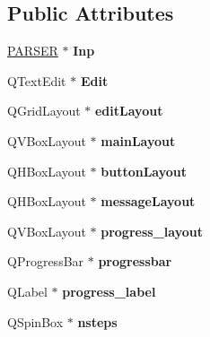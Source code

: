 \subsection*{Public Attributes}
\begin{DoxyCompactItemize}
\item 
\hypertarget{classMCWidget_af41f4fe9b11be0548003fb6eb9d2f733}{
\hyperlink{classPARSER}{PARSER} $\ast$ {\bfseries Inp}}
\label{classMCWidget_af41f4fe9b11be0548003fb6eb9d2f733}

\item 
\hypertarget{classMCWidget_a1a1b1f15ab4112cf8ffd85074c9d43ee}{
QTextEdit $\ast$ {\bfseries Edit}}
\label{classMCWidget_a1a1b1f15ab4112cf8ffd85074c9d43ee}

\item 
\hypertarget{classMCWidget_a6f1bc3f557bebcf39be998d2b3032920}{
QGridLayout $\ast$ {\bfseries editLayout}}
\label{classMCWidget_a6f1bc3f557bebcf39be998d2b3032920}

\item 
\hypertarget{classMCWidget_a7b5dc7811202dd6a863dbb42fd909889}{
QVBoxLayout $\ast$ {\bfseries mainLayout}}
\label{classMCWidget_a7b5dc7811202dd6a863dbb42fd909889}

\item 
\hypertarget{classMCWidget_ae07927c77de34c6c612f7a854482da89}{
QHBoxLayout $\ast$ {\bfseries buttonLayout}}
\label{classMCWidget_ae07927c77de34c6c612f7a854482da89}

\item 
\hypertarget{classMCWidget_a7ef81cf34e9ac1addda968b1fb9888fc}{
QHBoxLayout $\ast$ {\bfseries messageLayout}}
\label{classMCWidget_a7ef81cf34e9ac1addda968b1fb9888fc}

\item 
\hypertarget{classMCWidget_a48f0b116300a16dd1210129a97fd4491}{
QVBoxLayout $\ast$ {\bfseries progress\_\-layout}}
\label{classMCWidget_a48f0b116300a16dd1210129a97fd4491}

\item 
\hypertarget{classMCWidget_a1cecfae21daebd2c018d4239e37fe01c}{
QProgressBar $\ast$ {\bfseries progressbar}}
\label{classMCWidget_a1cecfae21daebd2c018d4239e37fe01c}

\item 
\hypertarget{classMCWidget_a25e6e9b0e054b1cd25b49f689676569b}{
QLabel $\ast$ {\bfseries progress\_\-label}}
\label{classMCWidget_a25e6e9b0e054b1cd25b49f689676569b}

\item 
\hypertarget{classMCWidget_a31bd738b465ac4d2529b10be56dc0ac0}{
QSpinBox $\ast$ {\bfseries nsteps}}
\label{classMCWidget_a31bd738b465ac4d2529b10be56dc0ac0}


\end{DoxyCompactItemize}
